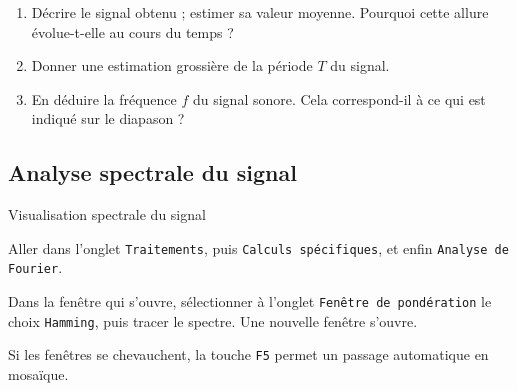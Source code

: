 \documentclass[a4paper,french,bookmarks]{article}
\begin{document}
\begin{enumerate}
    \item Décrire le signal obtenu ; estimer sa valeur moyenne. Pourquoi cette allure évolue-t-elle au cours du temps ?
    
    
    \item Donner une estimation grossière de la période $T$ du signal.
    
    
    \item En déduire la fréquence $f$ du signal sonore. Cela correspond-il à ce qui est indiqué sur le diapason ?
    
\end{enumerate}

\subsection{Analyse spectrale du signal}

\begin{experience}{Visualisation spectrale du signal}{}
    \begin{enumerate}
        \ithand Aller dans l'onglet \texttt{Traitements}, puis \texttt{Calculs spécifiques}, et enfin \texttt{Analyse de Fourier}.

        \ithand Dans la fenêtre qui s'ouvre, sélectionner à l'onglet \texttt{Fenêtre de pondération} le choix \texttt{Hamming}, puis tracer le spectre. Une nouvelle fenêtre s'ouvre.
        
        \ithand Si les fenêtres se chevauchent, la touche \texttt{F5} permet un passage automatique en mosaïque.
    \end{enumerate}
\end{experience}
\end{document}
